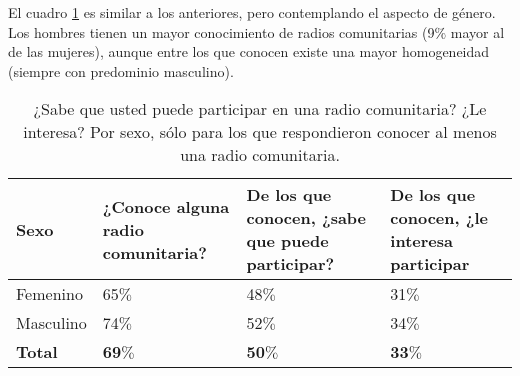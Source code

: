 \indent El cuadro \ref{SabePuedeParticiparSexoTabla} es similar a los anteriores, pero contemplando el aspecto de género. Los hombres tienen un mayor conocimiento de radios comunitarias (9$\%$ mayor al de las mujeres), aunque entre los que conocen existe una mayor homogeneidad (siempre con predominio masculino).
\begin{table}[htpb]
	\centering
{}
		\begin{tabular}{|p{1.5cm}|p{2.2cm}|p{3cm}|p{2.8cm}|}\hline
      \textbf{Sexo}&\textbf{¿Conoce alguna radio comunitaria?}&\textbf{De los que conocen, ¿sabe que puede participar?}&\textbf{De los que conocen, ¿le interesa participar}\\\hline\hline
			Femenino&	65$\%$&48$\%$&31$\%$\\\hline
			Masculino 	&	74$\%$&52$\%$&34$\%$\\\hline\hline
			\textbf{Total}	&\textbf{69$\%$}&\textbf{50$\%$}&\textbf{33$\%$}\\\hline
		\end{tabular}
	  \caption{¿Sabe que usted puede participar en una radio comunitaria? ¿Le interesa? Por sexo, sólo para los que respondieron conocer al menos una radio comunitaria.}
	  \label{SabePuedeParticiparSexoTabla}
\end{table}